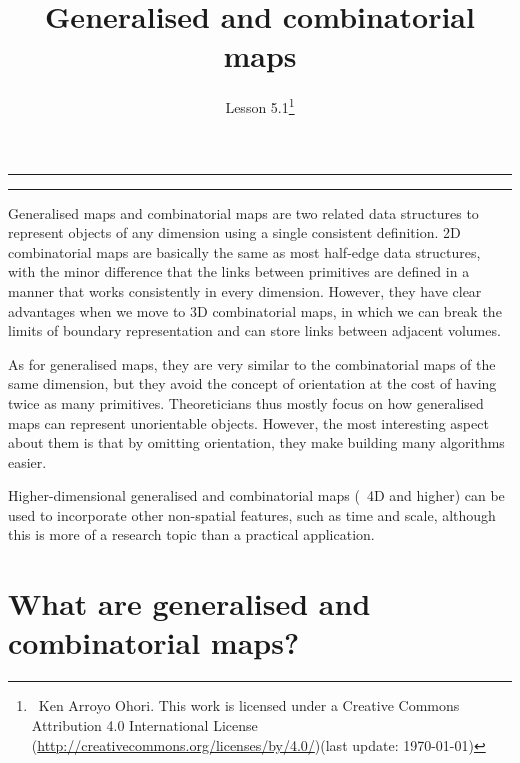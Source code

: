 
\newcommand{\lessonNumber}{Lesson 5.1}

\newtheorem{definition}{Definition}

\title{Generalised and combinatorial maps}


\ohead*{\lessonNumber}
\titlehead{\thispagestyle{headings}}
\author{\lessonNumber\footnote{\ccbysa\ Ken Arroyo Ohori. This work is licensed under a Creative Commons Attribution 4.0 International License (\url{http://creativecommons.org/licenses/by/4.0/})\newline(last update: \today)}}
\date{}

\pagestyle{scrheadings}

\maketitle

\noindent\rule{5cm}{0.4pt}
\tableofcontents
\noindent\rule{5cm}{0.4pt}
\vspace{5mm}


Generalised maps and combinatorial maps are two related data structures to represent objects of any dimension using a single consistent definition.
2D combinatorial maps are basically the same as most half-edge data structures, with the minor difference that the links between primitives are defined in a manner that works consistently in every dimension.
However, they have clear advantages when we move to 3D combinatorial maps, in which we can break the limits of boundary representation and can store links between adjacent volumes.

As for generalised maps, they are very similar to the combinatorial maps of the same dimension, but they avoid the concept of orientation at the cost of having twice as many primitives.
Theoreticians thus mostly focus on how generalised maps can represent unorientable objects.
However, the most interesting aspect about them is that by omitting orientation, they make building many algorithms easier.

Higher-dimensional generalised and combinatorial maps (\ie\ 4D and higher) can be used to incorporate other non-spatial features, such as time and scale, although this is more of a research topic than a practical application.

\section{What are generalised and combinatorial maps?}

